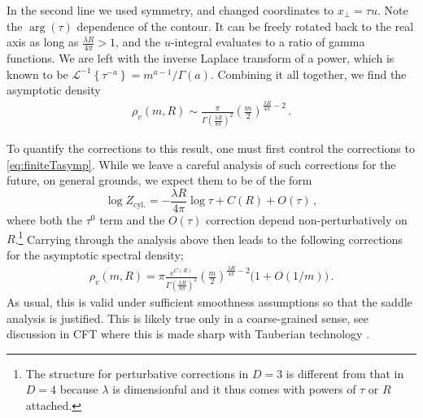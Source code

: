 \documentclass[
 reprint,
 amsmath,
 pre,
 amssymb,
 nofootinbib,
 aps,
 longbibliography,
]{revtex4-1}
\newcommand{\<}{{\langle}}
\renewcommand{\>}{{\rangle}}
\begin{document}
\noindent In the second line we used symmetry, and changed coordinates to $x_\bot = \tau u$. Note the $\arg(\tau)$ dependence of the contour. It can be freely rotated back to the real axis as long as $\frac{\lambda R}{4\pi} >1$, and the $u$-integral evaluates to a ratio of gamma functions. We are left with the inverse Laplace transform of a power, which is known to be $\mathcal L^{-1}\left\{\tau^{-a}\right\} =  m^{a-1}/\Gamma(a)$.
Combining it all together, we find the asymptotic density
\begin{gather}\label{eq:rho-asymp-D=3}
    \rho_v( m,R) \sim \frac{\pi}{\Gamma\left(\tfrac{\lambda R}{8\pi}\right)^2}\left(\frac{ m}{2}\right)^{\frac{\lambda R}{4\pi}-2}\,.
\end{gather}

To quantify the corrections to this result, one must first control the corrections to \eqref{eq:finiteTasymp}. While we leave a careful analysis of such corrections for the future, on general grounds, we expect them to be of the form
$$\log Z_\text{cyl.} = -\frac{\lambda R}{4\pi} \log\tau + C(R) + O(\tau)\,,$$
where both the $\tau^0$ term and the $O(\tau)$ correction depend non-perturbatively on $R$.\footnote{The structure for perturbative corrections in $D=3$ is different from that in $D=4$ because $\lambda$ is dimensionful and it thus comes with powers of $\tau$ or $R$ attached.}
Carrying through the analysis above then leads to the following corrections for the asymptotic spectral density;
\begin{gather}\label{eq:rho-asymp-D=3}
    \rho_v( m,R) =  \pi \frac{e^{C(R)}}{\Gamma\left(\tfrac{\lambda R}{8\pi}\right)^2}\left(\frac{ m}{2}\right)^{\frac{\lambda R}{4\pi}-2}\Big(1+O(1/ m)\Big)\,.
\end{gather}
As usual, this is valid under sufficient smoothness assumptions so that the saddle analysis is justified. This is likely true only in a coarse-grained sense, see discussion in CFT where this is made sharp with Tauberian technology \cite{Pappadopulo:2012jk,Das:2017vej,Qiao:2017xif,Mukhametzhanov:2018zja,Mukhametzhanov:2019pzy,Pal:2019zzr,Mukhametzhanov:2020swe,Das:2020uax}.
\end{document}
